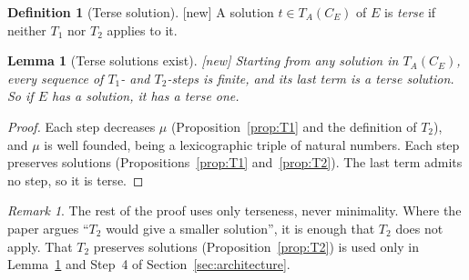 \documentclass[11pt]{article}
\newcommand{\CE}{C_E}
\newcommand{\New}{\textsf{[new]}}
\theoremstyle{plain}
\newtheorem{lemma}[theorem]{Lemma}
\theoremstyle{definition}
\newtheorem{definition}[theorem]{Definition}
\theoremstyle{remark}
\newtheorem{remark}[theorem]{Remark}
\begin{document}
\begin{definition}[Terse solution]\label{def:terse}
\New{} A solution $t\in T_A(\CE)$ of $E$ is \emph{terse} if neither $T_1$
nor $T_2$ applies to it.
\end{definition}

\begin{lemma}[Terse solutions exist]\label{lem:terse}
\New{} Starting from any solution in $T_A(\CE)$, every sequence
of $T_1$- and $T_2$-steps is finite, and its last term is a terse
solution.  So if $E$ has a solution, it has a terse one.
\end{lemma}
\begin{proof}
Each step decreases $\mu$ (Proposition~\ref{prop:T1} and the definition
of $T_2$), and $\mu$ is well founded, being a lexicographic triple of
natural numbers.  Each step preserves solutions
(Propositions~\ref{prop:T1} and~\ref{prop:T2}).  The last term admits no
step, so it is terse.
\end{proof}

\begin{remark}
The rest of the proof uses only terseness, never minimality.  Where the
paper argues ``$T_2$ would give a smaller solution'', it is enough that
$T_2$ does not apply.  That $T_2$ preserves solutions
(Proposition~\ref{prop:T2}) is used only in Lemma~\ref{lem:terse} and
Step~4 of Section~\ref{sec:architecture}.
\end{remark}
\end{document}
